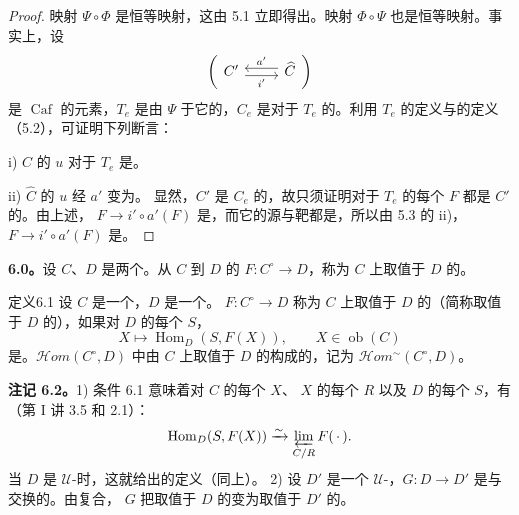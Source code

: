 \begin{proof}
映射 $\Psi\circ\Phi$ 是恒等映射，这由 5.1 立即得出。映射 $\Phi\circ\Psi$ 也是恒等映射。事实上，设
\[\left(\begin{tikzcd}C'\arrow[r,shift right=0.6ex,"i'"']&\widehat C\arrow[l,shift right=0.6ex,"a'"']\end{tikzcd}\right)\]
是 $\operatorname{Caf}$ 的元素，$T_e$ 是由 $\Psi$ 于它的，$C_e$ 是对于 $T_e$ 的。利用 $T_e$ 的定义与的定义（5.2），可证明下列断言：
\par i) $\widehat C$ 的 $u$ 对于 $T_e$ 是。
\par ii) $\widehat C$ 的 $u$ 经 $a'$ 变为。
显然，$C'$ 是 $C_e$ 的，故只须证明对于 $T_e$ 的每个 $F$ 都是 $C'$ 的。由上述， $F\to i'\circ a'(F)$ 是，而它的源与靶都是，所以由 5.3 的 ii)，$F\to i'\circ a'(F)$ 是。
\end{proof}

\textbf{6.0。}设 $C$、$D$ 是两个。从 $C$ 到 $D$ 的 $F:C^\circ\to D$，称为 $C$ 上取值于 $D$ 的。
\begin{SGAresult}{定义}{6.1}
设 $C$ 是一个，$D$ 是一个。 $F:C^\circ\to D$ 称为 $C$ 上取值于 $D$ 的（简称取值于 $D$ 的），如果对 $D$ 的每个 $S$，
\[X\longmapsto\operatorname{Hom}_D(S,F(X)),\qquad X\in\operatorname{ob}(C)\]
是。$\mathscr Hom(C^\circ,D)$ 中由 $C$ 上取值于 $D$ 的构成的，记为 $\mathscr Hom^{\sim}(C^\circ,D)$。
\end{SGAresult}
\textbf{注记 6.2。}1) 条件 6.1 意味着对 $C$ 的每个 $X$、 $X$ 的每个 $R$ 以及 $D$ 的每个 $S$，有（第 I 讲 3.5 和 2.1）：
\[\operatorname{Hom}_D(S,F(X))\xrightarrow{\sim}\varprojlim_{C/R}F(\,\cdot\,).\]
当 $D$ 是 $\mathcal U$-时，这就给出的定义（同上）。
2) 设 $D'$ 是一个 $\mathcal U$-，$G:D\to D'$ 是与交换的。由复合， $G$ 把取值于 $D$ 的变为取值于 $D'$ 的。

